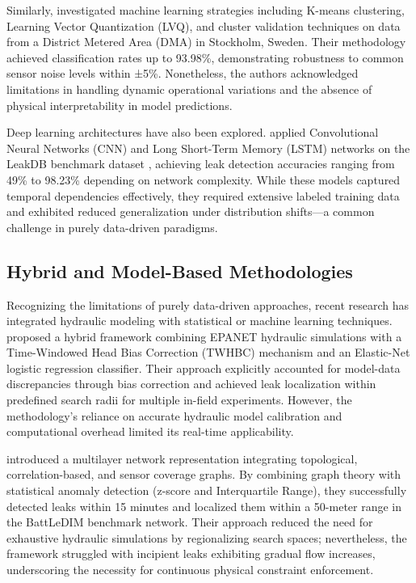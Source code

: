 \documentclass[final,5p,times,twocolumn,authoryear]{elsarticle}
\begin{document}
Similarly, \cite{sousa2023leakagedetection} investigated machine learning strategies including K-means clustering, Learning Vector Quantization (LVQ), and cluster validation techniques on data from a District Metered Area (DMA) in Stockholm, Sweden. Their methodology achieved classification rates up to 93.98\%, demonstrating robustness to common sensor noise levels within ±5\%. Nonetheless, the authors acknowledged limitations in handling dynamic operational variations and the absence of physical interpretability in model predictions.

Deep learning architectures have also been explored. \cite{punukollu2023leakdetection} applied Convolutional Neural Networks (CNN) and Long Short-Term Memory (LSTM) networks on the LeakDB benchmark dataset \cite{kyriakou2018leakdb}, achieving leak detection accuracies ranging from 49\% to 98.23\% depending on network complexity. While these models captured temporal dependencies effectively, they required extensive labeled training data and exhibited reduced generalization under distribution shifts—a common challenge in purely data-driven paradigms.

\subsection{Hybrid and Model-Based Methodologies}

Recognizing the limitations of purely data-driven approaches, recent research has integrated hydraulic modeling with statistical or machine learning techniques. \cite{mazaev2022probabilisticleaklocalization} proposed a hybrid framework combining EPANET hydraulic simulations with a Time-Windowed Head Bias Correction (TWHBC) mechanism and an Elastic-Net logistic regression classifier. Their approach explicitly accounted for model-data discrepancies through bias correction and achieved leak localization within predefined search radii for multiple in-field experiments. However, the methodology's reliance on accurate hydraulic model calibration and computational overhead limited its real-time applicability.

\cite{barros_leak_2025} introduced a multilayer network representation integrating topological, correlation-based, and sensor coverage graphs. By combining graph theory with statistical anomaly detection (z-score and Interquartile Range), they successfully detected leaks within 15 minutes and localized them within a 50-meter range in the BattLeDIM benchmark network. Their approach reduced the need for exhaustive hydraulic simulations by regionalizing search spaces; nevertheless, the framework struggled with incipient leaks exhibiting gradual flow increases, underscoring the necessity for continuous physical constraint enforcement.
\end{document}
